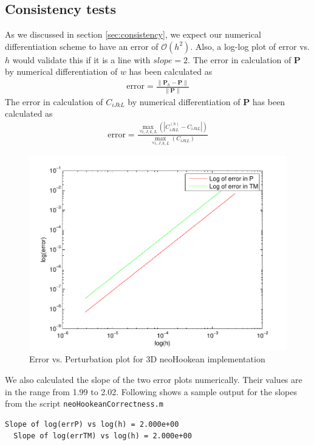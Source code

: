 \documentclass[../main.tex]{subfiles}
\begin{document}
\subsection{Consistency tests}
As we discussed in section \ref{sec:consistency}, we expect our
numerical differentiation scheme to have an error of
$\mathcal{O}(h^2)$. Also, a log-log plot of $\text{error}$ vs. $h$ would
validate this if it is a line with $slope=2$. The error in calculation
of $\mathbf{P}$ by numerical differentiation of $w$ has been
calculated as
\begin{align*}
 \text{error} = \frac{\lVert\mathbf{P}_h - \mathbf{P}\rVert}{\lVert\mathbf{P}\rVert}
\end{align*}
The error in calculation of $C_{iJkL}$ by numerical differentiation
of $\mathbf{P}$ has been calculated as
\begin{align*}
  \text{error} =\frac{\underset{\forall i,J,k,L}{\max}\left(|C^{(h)}_{iJkL}-C_{iJkL}|\right)}{\underset{\forall i,J,k,L}{\max}\left(C_{iJkL}\right)}
\end{align*}
\begin{figure}[h]
  \centering
  \includegraphics{./img/neoHookConsistency.pdf}  
  \caption{Error vs. Perturbation plot for 3D neoHookean implementation}
  \label{fig:neoHcon}
\end{figure}
We also calculated the slope of the two error plots numerically. Their values are in the range from 1.99 to 2.02. Following shows a sample output for the slopes from the script \texttt{neoHookeanCorrectness.m}
\begin{lstlisting}[frame=single]
  Slope of log(errP) vs log(h) = 2.000e+00
  Slope of log(errTM) vs log(h) = 2.000e+00
\end{lstlisting}
\end{document}
